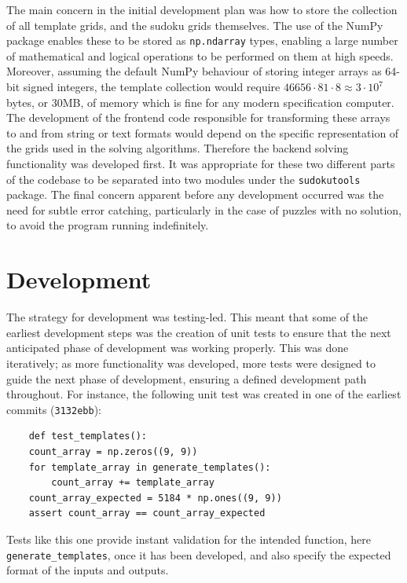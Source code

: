 \documentclass[12pt]{article}
\begin{document}
The main concern in the initial development plan was how to store the collection of all template grids, and the sudoku grids themselves.
The use of the NumPy package enables these to be stored as \texttt{np.ndarray} types, enabling a large number of mathematical and logical operations to be performed on them at high speeds.
Moreover, assuming the default NumPy behaviour of storing integer arrays as 64-bit signed integers, the template collection would require $46656\cdot81\cdot8\approx3\cdot10^7$ bytes, or 30MB, of memory which is fine for any modern specification computer.
The development of the frontend code responsible for transforming these arrays to and from string or text formats would depend on the specific representation of the grids used in the solving algorithms.
Therefore the backend solving functionality was developed first.
It was appropriate for these two different parts of the codebase to be separated into two modules under the \texttt{sudokutools} package.
The final concern apparent before any development occurred was the need for subtle error catching, particularly in the case of puzzles with no solution, to avoid the program running indefinitely.

\section{Development}
The strategy for development was testing-led.
This meant that some of the earliest development steps was the creation of unit tests to ensure that the next anticipated phase of development was working properly.
This was done iteratively; as more functionality was developed, more tests were designed to guide the next phase of development, ensuring a defined development path throughout.
For instance, the following unit test was created in one of the earliest commits (\texttt{3132ebb}):

\begin{lstlisting}
    def test_templates():
    count_array = np.zeros((9, 9))
    for template_array in generate_templates():
        count_array += template_array
    count_array_expected = 5184 * np.ones((9, 9))
    assert count_array == count_array_expected
\end{lstlisting}

Tests like this one provide instant validation for the intended function, here \texttt{generate\_templates}, once it has been developed, and also specify the expected format of the inputs and outputs.
\end{document}
